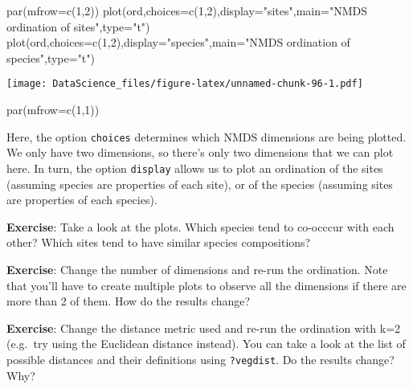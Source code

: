 \documentclass[
]{book}
\newenvironment{Shaded}{\begin{snugshade}}{\end{snugshade}}
\newcommand{\AttributeTok}[1]{\textcolor[rgb]{0.77,0.63,0.00}{#1}}
\newcommand{\DecValTok}[1]{\textcolor[rgb]{0.00,0.00,0.81}{#1}}
\newcommand{\FunctionTok}[1]{\textcolor[rgb]{0.00,0.00,0.00}{#1}}
\newcommand{\NormalTok}[1]{#1}
\newcommand{\StringTok}[1]{\textcolor[rgb]{0.31,0.60,0.02}{#1}}
\begin{document}
\begin{Shaded}
\begin{Highlighting}[]
\FunctionTok{par}\NormalTok{(}\AttributeTok{mfrow=}\FunctionTok{c}\NormalTok{(}\DecValTok{1}\NormalTok{,}\DecValTok{2}\NormalTok{))}
\FunctionTok{plot}\NormalTok{(ord,}\AttributeTok{choices=}\FunctionTok{c}\NormalTok{(}\DecValTok{1}\NormalTok{,}\DecValTok{2}\NormalTok{),}\AttributeTok{display=}\StringTok{"sites"}\NormalTok{,}\AttributeTok{main=}\StringTok{"NMDS ordination of sites"}\NormalTok{,}\AttributeTok{type=}\StringTok{"t"}\NormalTok{)}
\FunctionTok{plot}\NormalTok{(ord,}\AttributeTok{choices=}\FunctionTok{c}\NormalTok{(}\DecValTok{1}\NormalTok{,}\DecValTok{2}\NormalTok{),}\AttributeTok{display=}\StringTok{"species"}\NormalTok{,}\AttributeTok{main=}\StringTok{"NMDS ordination of species"}\NormalTok{,}\AttributeTok{type=}\StringTok{"t"}\NormalTok{)}
\end{Highlighting}
\end{Shaded}

\texttt{[image: DataScience\_files/figure-latex/unnamed-chunk-96-1.pdf]}

\begin{Shaded}
\begin{Highlighting}[]
\FunctionTok{par}\NormalTok{(}\AttributeTok{mfrow=}\FunctionTok{c}\NormalTok{(}\DecValTok{1}\NormalTok{,}\DecValTok{1}\NormalTok{))}
\end{Highlighting}
\end{Shaded}

Here, the option \texttt{choices} determines which NMDS dimensions are being plotted. We only have two dimensions, so there's only two dimensions that we can plot here. In turn, the option \texttt{display} allows us to plot an ordination of the sites (assuming species are properties of each site), or of the species (assuming sites are properties of each species).

\textbf{Exercise}: Take a look at the plots. Which species tend to co-occcur with each other? Which sites tend to have similar species compositions?

\textbf{Exercise}: Change the number of dimensions and re-run the ordination. Note that you'll have to create multiple plots to observe all the dimensions if there are more than 2 of them. How do the results change?

\textbf{Exercise}: Change the distance metric used and re-run the ordination with k=2 (e.g.~try using the Euclidean distance instead). You can take a look at the list of possible distances and their definitions using \texttt{?vegdist}. Do the results change? Why?
\end{document}

